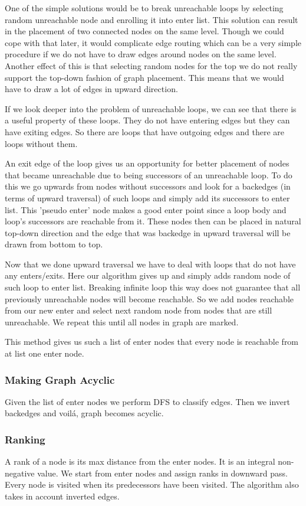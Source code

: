 \documentclass[11pt,twoside,a4paper]{article}
\begin{document}
One of the simple solutions would be to break unreachable loops by selecting random unreachable node and enrolling it into enter list. This solution can result in the placement of two connected nodes on the same level. Though we could cope with that later, it would complicate edge routing which can be a very simple procedure if we do not have to draw edges around nodes on the same level. Another effect of this is that selecting random nodes for the top we do not really support the top-down fashion of graph placement. This means that we would have to draw a lot of edges in upward direction.

If we look deeper into the problem of unreachable loops, we can see that there is a useful property of these loops. They do not have entering edges but they can have exiting edges. So there are loops that have outgoing edges and there are loops without them. 

An exit edge of the loop gives us an opportunity for better placement of nodes that became unreachable due to being successors of an unreachable loop. To do this we go upwards from nodes without successors and look for a backedges (in terms of upward traversal) of such loops and simply add its successors to enter list. This 'pseudo enter' node makes a good enter point since a loop body and loop's successors are reachable from it. These nodes then can be placed in natural top-down direction and the edge that was backedge in upward traversal will be drawn from bottom to top.

Now that we done upward traversal we have to deal with loops that do not have any enters/exits. Here our algorithm gives up and simply adds random node of such loop to enter list. Breaking infinite loop this way does not guarantee that all previously unreachable nodes will become reachable. So we add nodes reachable from our new enter and select next random node from nodes that are still unreachable. We repeat this until all nodes in graph are marked.

This method gives us such a list of enter nodes that every node is reachable from at list one enter node.

\subsubsection{Making Graph Acyclic}
Given the list of enter nodes we perform DFS to classify edges. Then we invert backedges and voil\'a, graph becomes acyclic.

\subsubsection{Ranking}
A rank of a node is its max distance from the enter nodes. It is an integral non-negative value. We start from enter nodes and assign ranks in downward pass. Every node is visited when its predecessors have been visited. The algorithm also takes in account inverted edges.
\end{document}

